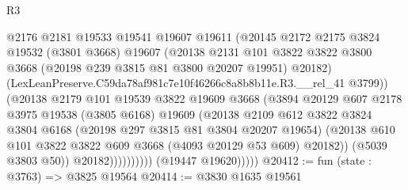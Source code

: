 \begin{lexlean}{R3}
\begin{coremodule}
                              @2176
                              @2181
                              @19533
                              @19541
                              @19607
                              @19611
                              (@20145
                                @2172
                                @2175
                                @3824
                                @19532
                                (@3801 @3668)
                                @19607
                                (@20138
                                  @2131
                                  @101
                                  @3822
                                  @3822
                                  @3800
                                  @3668
                                  (@20198 @239 @3815 @81 @3800 @20207 @19951)
                                  @20182)
                                (LexLeanPreserve.C59da78af981c7e10f46266c8a8b8b11e.R3.__rel_41
                                  @3799))
                              (@20138
                                @2179
                                @101
                                @19539
                                @3822
                                @19609
                                @3668
                                (@3894
                                  @20129
                                  @607
                                  @2178
                                  @3975
                                  @19538
                                  (@3805 @6168)
                                  @19609
                                  (@20138
                                    @2109
                                    @612
                                    @3822
                                    @3824
                                    @3804
                                    @6168
                                    (@20198 @297 @3815 @81 @3804 @20207 @19654)
                                    (@20138
                                      @610
                                      @101
                                      @3822
                                      @3822
                                      @609
                                      @3668
                                      (@4093 @20129 @53 @609)
                                      @20182))
                                  (@5039 @3803 @50))
                                @20182))))))))))
            (@19447 @19620)))))
@20412 := fun (state : @3763) => @3825 @19564
@20414 := @3830 @1635 @19561

\end{coremodule}
\end{lexlean}
